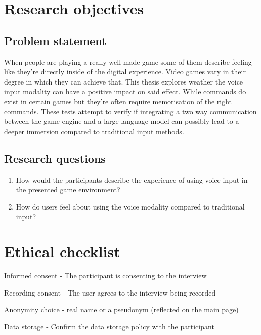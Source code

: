 

\section{Research objectives}

\subsection{Problem statement}

When people are  playing a really well made game some of them  describe feeling like they're directly inside of the digital experience.
Video games vary in their degree in which they can achieve that. This thesis explores weather the voice input modality can have a positive impact on said effect. 
While commands do exist in certain games but they're often require memorisation of the right commands.
These tests attempt to verify if integrating a two way communication between the game engine and a large language model can possibly lead to a deeper immersion compared to traditional input methods.

\subsection{Research questions}

\begin{enumerate}
    \item How would the participants describe the experience of using voice input in the presented
game environment?
    \item How do users feel about using the voice modality compared to traditional input?
\end{enumerate}

\section{Ethical checklist}
    \begin{todolist}
    \item[\done] Informed consent - The participant is consenting to the interview
    \item[\done] Recording consent - The user agrees to the interview being recorded
    \item[\done] Anonymity choice - real name or a pseudonym (reflected on the main page)
    \item[\done] Data storage - Confirm the data storage policy with the participant
    \end{todolist}

